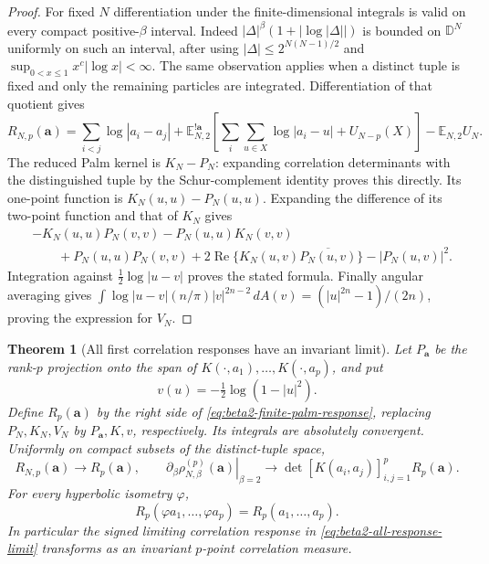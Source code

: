 \documentclass[11pt,a4paper]{article}
\numberwithin{equation}{section}
\newtheorem{theorem}{Theorem}[section]
\theoremstyle{definition}
\theoremstyle{remark}
\newcommand{\D}{\mathbb D}
\newcommand{\E}{\mathbb E}
\begin{document}
\begin{proof}
For fixed $N$ differentiation under the finite-dimensional integrals
is valid on every compact positive-$\beta$ interval.  Indeed
$|\Delta|^\beta(1+|\log|\Delta||)$ is bounded on $\D^N$ uniformly on
such an interval, after using $|\Delta|\le2^{N(N-1)/2}$ and
$\sup_{0<x\le1}x^c|\log x|<\infty$.  The same observation applies
when a distinct tuple is fixed and only the remaining particles are
integrated.  Differentiation of that quotient gives
\[
 R_{N,p}(\mathbf a)=\sum_{i<j}\log|a_i-a_j|
  +\E_{N,2}^{!\mathbf a}\left[
       \sum_i\sum_{u\in X}\log|a_i-u|+U_{N-p}(X)\right]
  -\E_{N,2}U_N.
\]
The reduced Palm kernel is $K_N-P_N$: expanding correlation
determinants with the distinguished tuple by the Schur-complement
identity proves this directly.  Its one-point function is
$K_N(u,u)-P_N(u,u)$.  Expanding the difference of its two-point
function and that of $K_N$ gives
\begin{align*}
 &-K_N(u,u)P_N(v,v)-P_N(u,u)K_N(v,v)\\
 &\qquad+P_N(u,u)P_N(v,v)
 +2\operatorname{Re}\{K_N(u,v)\overline{P_N(u,v)}\}
 -|P_N(u,v)|^2.
\end{align*}
Integration against $\tfrac12\log|u-v|$ proves the stated formula.
Finally angular averaging gives
$\int\log|u-v|(n/\pi)|v|^{2n-2}\,dA(v)
=(|u|^{2n}-1)/(2n)$, proving the expression for $V_N$.
\end{proof}

\begin{theorem}[All first correlation responses have an invariant limit]
\label{thm:beta2-all-response}
Let $P_{\mathbf a}$ be the rank-$p$ projection onto the span of
$K(\cdot,a_1),\ldots,K(\cdot,a_p)$, and put
\[
 v(u)=-\tfrac12\log(1-|u|^2).
\]
Define $R_p(\mathbf a)$ by the right side of
\eqref{eq:beta2-finite-palm-response}, replacing $P_N,K_N,V_N$ by
$P_{\mathbf a},K,v$, respectively.  Its integrals are absolutely
convergent.  Uniformly on compact subsets of the distinct-tuple space,
\begin{equation}
 R_{N,p}(\mathbf a)\longrightarrow R_p(\mathbf a),\qquad
 \left.\partial_\beta\rho_{N,\beta}^{(p)}(\mathbf a)\right|_{\beta=2}
 \longrightarrow\det[K(a_i,a_j)]_{i,j=1}^pR_p(\mathbf a).
 \label{eq:beta2-all-response-limit}
\end{equation}
For every hyperbolic isometry $\varphi$,
\begin{equation}
 R_p(\varphi a_1,\ldots,\varphi a_p)=R_p(a_1,\ldots,a_p).
 \label{eq:beta2-response-invariant}
\end{equation}
In particular the signed limiting correlation response in
\eqref{eq:beta2-all-response-limit} transforms as an invariant
$p$-point correlation measure.
\end{theorem}
\end{document}
